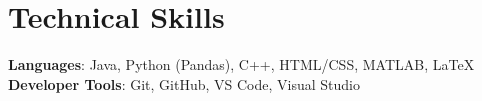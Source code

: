 \section{Technical Skills}
 \begin{itemize}[leftmargin=0.15in, label={}]
    \small{\item{
     \textbf{Languages}{: Java, Python (Pandas), C++, HTML/CSS, MATLAB, LaTeX} \\
     \textbf{Developer Tools}{: Git, GitHub, VS Code, Visual Studio} \\
    }}
 \end{itemize}
